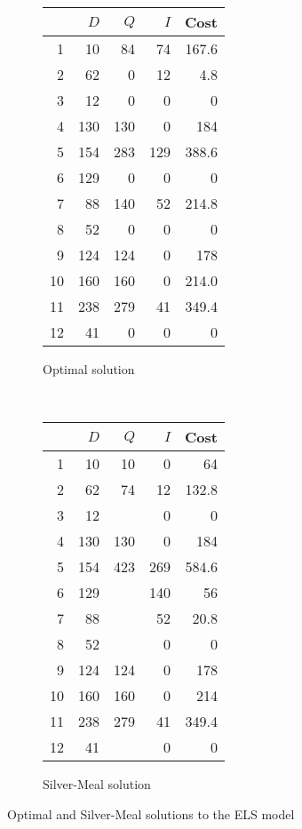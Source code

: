 \begin{exercise}
\begin{solution}
\begin{figure}[htbp]
\begin{subfigure}[b]{0.5\textwidth}
  \centering
    \begin{tabular}{rrrrr}
    \toprule
          & $D$ & $Q$ & $I$ & Cost \\
	\midrule
    1     & 10    & 84    & 74    & 167.6 \\
    2     & 62    & 0     & 12    & 4.8 \\
    3     & 12    & 0     & 0     & 0 \\
    4     & 130   & 130   & 0     & 184 \\
    5     & 154   & 283   & 129   & 388.6 \\
    6     & 129   & 0     & 0     & 0 \\
    7     & 88    & 140   & 52    & 214.8 \\
    8     & 52    & 0     & 0     & 0 \\
    9     & 124   & 124   & 0     & 178 \\
    10    & 160   & 160   & 0     & 214.0 \\
    11    & 238   & 279   & 41    & 349.4 \\
    12    & 41    & 0     & 0     & 0 \\
    \bottomrule
    \end{tabular}%
\caption{Optimal solution}
\label{fig:LS_opt}
\end{subfigure}
~
\begin{subfigure}[b]{0.5\textwidth}
  \centering
    \begin{tabular}{rrrrr}
    \toprule
          & $D$ & $Q$ & $I$ & Cost \\
	\midrule
    1     & 10    & 10    & 0     & 64 \\
    2     & 62    & 74    & 12    & 132.8 \\
    3     & 12    &       & 0     & 0 \\
    4     & 130   & 130   & 0     & 184 \\
    5     & 154   & 423   & 269   & 584.6 \\
    6     & 129   &       & 140   & 56 \\
    7     & 88    &       & 52    & 20.8 \\
    8     & 52    &       & 0     & 0 \\
    9     & 124   & 124   & 0     & 178 \\
    10    & 160   & 160   & 0     & 214 \\
    11    & 238   & 279   & 41    & 349.4 \\
    12    & 41    &       & 0     & 0 \\
    \bottomrule
    \end{tabular}%
\caption{Silver-Meal solution}
\label{fig:LS_SM}
\end{subfigure}
\caption{Optimal and Silver-Meal solutions to the ELS model}
\end{figure}
\end{solution}
\end{exercise}



